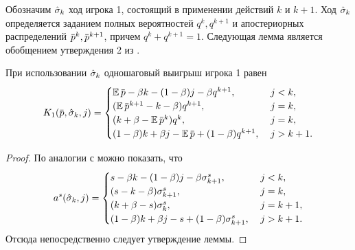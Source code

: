 {Обозначим $\hat{\sigma}_k$ ход игрока 1, состоящий в применении действий $k$ и $k+1$.
Ход $\hat{\sigma}_k$ определяется заданием полных вероятностей $q^k, q^{k+1}$ и
апостериорных распределений $\p^k, \p^{k+1}$, причем $q^k + q^{k+1} = 1$.
Следующая лемма является обобщением утверждения 2 из \cite{pyanykh16:discr:ru}.
\begin{lemma}
  \label{lower-bound:lemma:stage-payoff}
  При использовании $\hat{\sigma}_k$ одношаговый выигрыш игрока 1 равен
  \begin{equation*}
    \K[1](\p, \sigmak_k, j) = \begin{cases}
      \E \p - \beta k - (1-\beta) j - \beta q^{k+1}, &\; j < k, \\
      (\E \p^{k+1} - k - \beta) q^{k+1}, &\; j = k, \\
      (k + \beta - \E \p^k) q^k, &\; j = k, \\
      (1-\beta) k + \beta j - \E \p + (1-\beta) q^{k+1}, &\; j > k + 1.
    \end{cases}
  \end{equation*}
\end{lemma}
\begin{proof}
  По аналогии с \cite{pyanykh16:discr:ru} можно показать, что
  \begin{equation*}
    a^s(\hat{\sigma}_k, j) = \begin{cases}
      s - \beta k - (1-\beta) j - \beta \sigma^s_{k+1}, &\; j < k,\\
      (s - k - \beta) \sigma^s_{k+1}, &\; j = k,\\
      (k + \beta - s) \sigma^s_k, &\; j = k+1,\\
      (1-\beta) k + \beta j - s + (1-\beta) \sigma^s_{k+1}, &\; j > k + 1.
    \end{cases}
  \end{equation*}
  Отсюда непосредственно следует утверждение леммы.
\end{proof}

}
